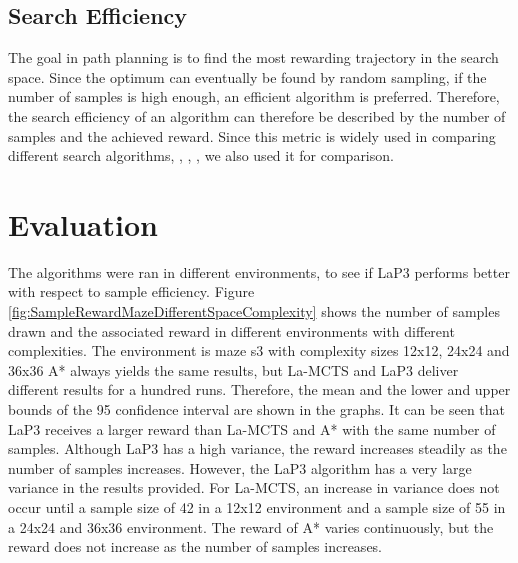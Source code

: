 \documentclass[bibliography=totoc]{scrartcl}
\begin{document}
\subsection{Search Efficiency}
The goal in path planning is to find the most rewarding trajectory in the search space.
Since the optimum can eventually be found by random sampling, if the number of samples is high enough, an efficient algorithm is preferred.
Therefore, the search efficiency of an algorithm can therefore be described by the number of samples and the achieved reward.
Since this metric is widely used in comparing different search algorithms, \cite{La-MCTS}, \cite{LaNAS}, \cite{VOOT}, we also used it for comparison.
\newpage
\section{Evaluation}


The algorithms were ran in different environments, to see if \ac{LaP3} performs better with respect to sample efficiency.
Figure \ref{fig:SampleRewardMazeDifferentSpaceComplexity} shows the number of samples drawn and the associated reward in different environments with different complexities.
The environment is maze s3 with complexity sizes 12x12, 24x24 and 36x36
A* always yields the same results, but \ac{La-MCTS} and \ac{LaP3} deliver different results for a hundred runs. 
Therefore, the mean and the lower and upper bounds of the 95 confidence interval are shown in the graphs.
It can be seen that \ac{LaP3} receives a larger reward than \ac{La-MCTS} and A* with the same number of samples.
Although \ac{LaP3} has a high variance, the reward increases steadily as the number of samples increases.
However, the \ac{LaP3} algorithm has a very large variance in the results provided.
For \ac{La-MCTS}, an increase in variance does not occur until a sample size of 42 in a 12x12 environment and a sample size of 55 in a 24x24 and 36x36 environment.
The reward of A* varies continuously, but the reward does not increase as the number of samples increases.
\end{document}
